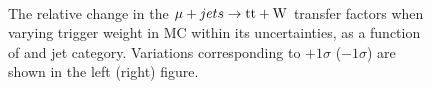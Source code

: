 \begin{figure}[!h]
  \centering
   ~~
  \\

  \caption{\label{fig:tfSyst_trigger_muToTtw} The relative change in the $\mu + jets \rightarrow \mathrm{tt+W}$ transfer
  factors when varying trigger weight in MC within its uncertainties, as a function of \scalht and jet category. 
  Variations corresponding to $+1\sigma$ ($-1\sigma$) are shown in the left (right) figure. 
  }
\end{figure}
%
